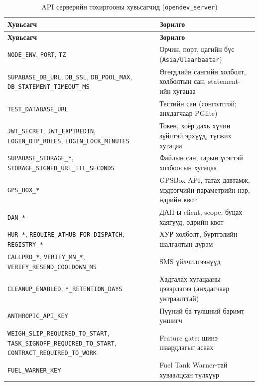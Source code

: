 \documentclass[
12pt,
oneside,
english,
onehalfspacing,
nolistspacing,
headsepline,
]{MUST-Thesis}
\begin{document}
{\small
\renewcommand{\arraystretch}{1.15}
\begin{longtable}{|L{5.6cm}|L{8.2cm}|}
\caption{API серверийн тохиргооны хувьсагчид (\texttt{opendev\_server})}\label{tab:app-env-api}\\
\hline
{}\textbf{Хувьсагч} & \textbf{Зорилго} \\ \hline
\endfirsthead
\hline
{}\textbf{Хувьсагч} & \textbf{Зорилго} \\ \hline
\endhead
\texttt{NODE\_ENV}, \texttt{PORT}, \texttt{TZ} & Орчин, порт, цагийн бүс (\texttt{Asia/Ulaanbaatar}) \\ \hline
\texttt{SUPABASE\_DB\_URL}, \texttt{DB\_SSL}, \texttt{DB\_POOL\_MAX}, \texttt{DB\_STATEMENT\_TIMEOUT\_MS} & Өгөгдлийн сангийн холболт, холболтын сан, statement-ийн хугацаа \\ \hline
\texttt{TEST\_DATABASE\_URL} & Тестийн сан (сонголттой; анхдагчаар PGlite) \\ \hline
\texttt{JWT\_SECRET}, \texttt{JWT\_EXPIREDIN}, \texttt{LOGIN\_OTP\_ROLES}, \texttt{LOGIN\_LOCK\_MINUTES} & Токен, хоёр дахь хүчин зүйлтэй эрхүүд, түгжих хугацаа \\ \hline
\texttt{SUPABASE\_STORAGE\_*}, \texttt{STORAGE\_SIGNED\_URL\_TTL\_SECONDS} & Файлын сан, гарын үсэгтэй холбоосын хугацаа \\ \hline
\texttt{GPS\_BOX\_*} & GPSBox API, татах давтамж, мэдрэгчийн параметрийн нэр, өдрийн квот \\ \hline
\texttt{DAN\_*} & ДАН-ы client, scope, буцах хаягууд, өдрийн квот \\ \hline
\texttt{HUR\_*}, \texttt{REQUIRE\_ATHUB\_FOR\_DISPATCH}, \texttt{REGISTRY\_*} & ХУР холболт, бүртгэлийн шалгалтын дүрэм \\ \hline
\texttt{CALLPRO\_*}, \texttt{VERIFY\_MN\_*}, \texttt{VERIFY\_RESEND\_COOLDOWN\_MS} & SMS үйлчилгээнүүд \\ \hline
\texttt{CLEANUP\_ENABLED}, \texttt{*\_RETENTION\_DAYS} & Хадгалах хугацааны цэвэрлэгээ (анхдагчаар унтраалттай) \\ \hline
\texttt{ANTHROPIC\_API\_KEY} & Пүүний ба түлшний баримт уншигч \\ \hline
\texttt{WEIGH\_SLIP\_REQUIRED\_TO\_START}, \texttt{TASK\_SIGNOFF\_REQUIRED\_TO\_START}, \texttt{CONTRACT\_REQUIRED\_TO\_WORK} & Feature gate: шинэ шаардлагыг асаах \\ \hline
\texttt{FUEL\_WARNER\_KEY} & Fuel Tank Warner-тай хуваалцсан түлхүүр \\ \hline
\end{longtable}
}
\end{document}
